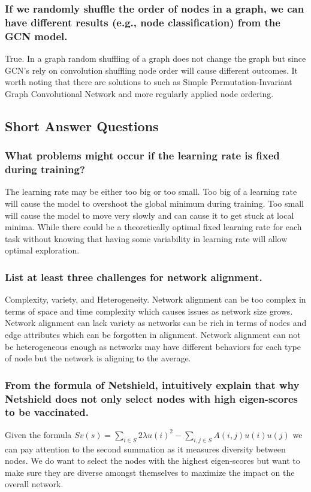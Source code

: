 \documentclass[11pt]{article}
\begin{document}
\subsubsection{If we randomly shuffle the order of nodes in a graph, we can have different results (e.g., node classification) from the GCN model.}
True. In a graph random shuffling of a graph does not change the graph but since GCN's rely on convolution shuffling node order will cause different outcomes. It worth noting that there are solutions to such as Simple Permutation-Invariant Graph
Convolutional Network and more regularly applied node ordering.
\subsection{Short Answer Questions}
\subsubsection{What problems might occur if the learning rate is fixed during training?}
The learning rate may be either too big or too small. Too big of a learning rate will cause the model to overshoot the global minimum during training. Too small will cause the model to move very slowly and can cause it to get stuck at local minima. While there could be a theoretically optimal fixed learning rate for each task without knowing that having some variability in learning rate will allow optimal exploration.
\subsubsection{List at least three challenges for network alignment.}
Complexity, variety, and Heterogeneity. Network alignment can be too complex in terms of space and time complexity which causes issues as network size grows. Network alignment can lack variety as networks can be rich in terms of nodes and edge attributes which can be forgotten in alignment. Network alignment can not be heterogeneous enough as networks may have different behaviors for each type of node but the network is aligning to the average. 
\subsubsection{From the formula of Netshield, intuitively explain that why Netshield does not only select nodes with high eigen-scores to be vaccinated.}
Given the formula $Sv(s) = \sum_{i \in S} 2\lambda u (i)^2-\sum_{i,j \in S} A(i,j)u(i)u(j)$ we can pay attention to the second summation as it measures diversity between nodes. We do want to select the nodes with the highest eigen-scores but want to make sure they are diverse amongst themselves to maximize the impact on the overall network. 
\end{document}
